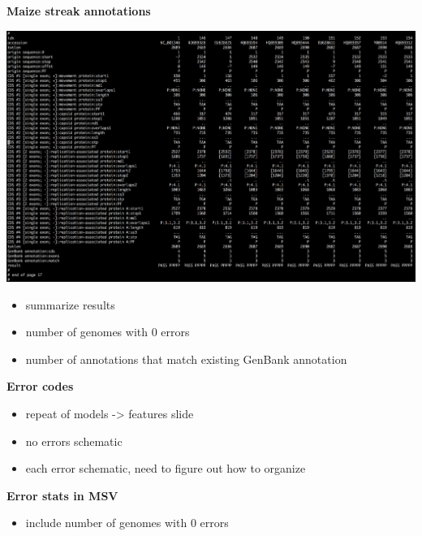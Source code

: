 \documentclass[landscape]{slides}
\begin{document}
\begin{slide}
\begin{center}
\textbf{Maize streak annotations}

\includegraphics[width=8in]{figs/msv-tbl-screenshot}

\begin{itemize}
\item summarize results
\item number of genomes with 0 errors
\item number of annotations that match existing GenBank annotation
\end{itemize}

\end{center}
\vfill
\end{slide}
\begin{slide}
\begin{center}
\textbf{Error codes}

\begin{itemize}
\item repeat of models -> features slide
\item no errors schematic
\item each error schematic, need to figure out how to organize
\end{itemize}

\end{center}
\vfill
\end{slide}
\begin{slide}
\begin{center}
\textbf{Error stats in MSV}

\begin{itemize}
\item include number of genomes with 0 errors
\end{itemize}

\end{center}
\vfill
\end{slide}
\end{document}
